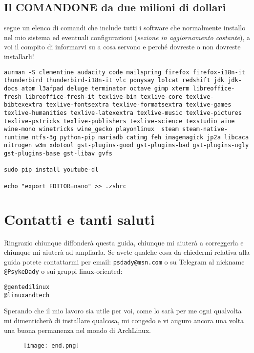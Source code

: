 \documentclass[twoside,italian]{book}
\newcommand{\code}[1]{\texttt{#1}}
\newcommand{\arch}{ArchLinux}
\begin{document}
\section{Il COMANDONE da due milioni di dollari}
    segue un elenco di comandi che include tutti i software che normalmente installo nel mio sistema ed eventuali configurazioni (\emph{sezione in aggiornamento costante}), a voi il compito di informarvi su a cosa servono e perché dovreste o non dovreste installarli!
\begin{lstlisting}
aurman -S clementine audacity code mailspring firefox firefox-i18n-it thunderbird thunderbird-i18n-it vlc ponysay lolcat redshift jdk jdk-docs atom l3afpad deluge terminator octave gimp xterm libreoffice-fresh libreoffice-fresh-it texlive-bin texlive-core texlive-bibtexextra texlive-fontsextra texlive-formatsextra texlive-games texlive-humanities texlive-latexextra texlive-music texlive-pictures texlive-pstricks texlive-publishers texlive-science texstudio wine wine-mono winetricks wine_gecko playonlinux  steam steam-native-runtime ntfs-3g python-pip mariadb catimg feh imagemagick jp2a libcaca nitrogen w3m xdotool gst-plugins-good gst-plugins-bad gst-plugins-ugly gst-plugins-base gst-libav gvfs 

sudo pip install youtube-dl

echo "export EDITOR=nano" >> .zshrc
\end{lstlisting}

\chapter*{Contatti e tanti saluti}
    Ringrazio chiunque diffonderà questa guida, chiunque mi aiuterà a correggerla e chiunque mi aiuterà ad ampliarla. 
    Se avete qualche cosa da chiedermi relativa alla guida potete contattarmi per email: \code{psdady@msn.com} o su Telegram al nickname \code{@PsykeDady} o sui gruppi linux-oriented: 
    \begin{lstlisting}
@gentedilinux
@linuxandtech
    \end{lstlisting}

    Sperando che il mio lavoro sia utile per voi, come lo sarà per me ogni qualvolta mi dimenticherò di installare qualcosa, mi congedo e vi auguro ancora una volta una  buona permanenza nel mondo di \arch.
    
    \begin{figure}[htp]
        \centering
        \texttt{[image: end.png]}
    \end{figure}
\end{document}
